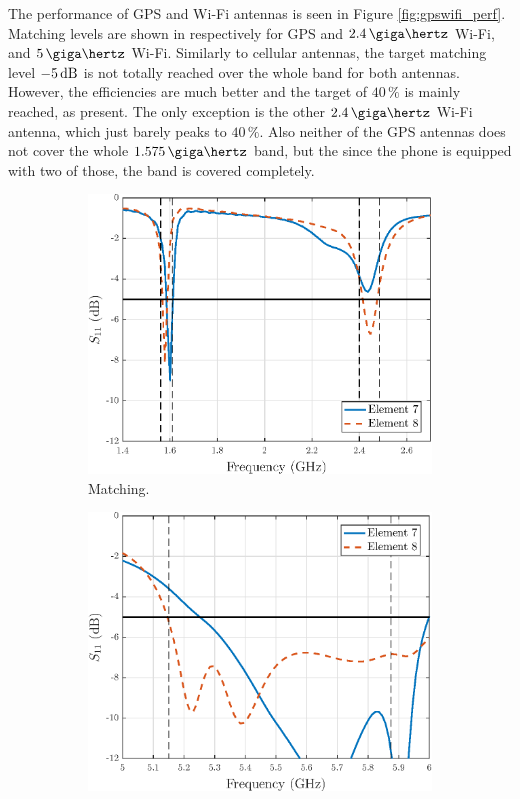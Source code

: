 The performance of GPS and Wi-Fi antennas is seen in Figure \ref{fig:gpswifi_perf}. Matching levels are shown in  respectively for GPS and $2.4\,\giga\hertz$ Wi-Fi, and $5\,\giga\hertz$ Wi-Fi. Similarly to cellular antennas, the target matching level $-5\,\mathrm{dB}$ is not totally reached over the whole band for both antennas. However, the efficiencies are much better and the target of $40\,\%$ is mainly reached, as  present. The only exception is the other $2.4\,\giga\hertz$ Wi-Fi antenna, which just barely peaks to $40\,\%$. Also neither of the GPS antennas does not cover the whole $1.575\,\giga\hertz$ band, but the since the phone is equipped with two of those, the band is covered completely.
\begin{figure}[H]
\vspace{-5pt}
    \centering
    \begin{subfigure}[b]{0.48\textwidth}
        \includegraphics[width=\textwidth]{img/wifilow_match_wgps.eps}
        \caption{Matching.}
        \label{fig:wifilow_match}
    \end{subfigure}
    \begin{subfigure}[b]{0.48\textwidth}
        \includegraphics[width=\textwidth]{img/wifihi_match_wgps.eps}

\end{subfigure}
\end{figure}
